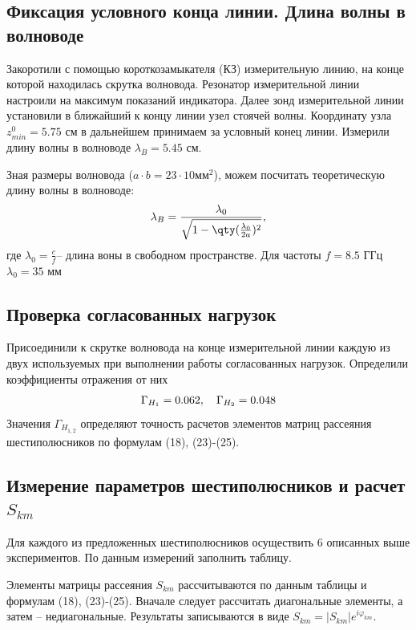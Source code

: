 \subsection{Фиксация условного конца линии. Длина волны в волноводе}

Закоротили с помощью короткозамыкателя (КЗ) измерительную линию, на конце которой  находилась скрутка волновода. Резонатор измерительной линии настроили на максимум показаний индикатора. Далее зонд измерительной линии установили в ближайший к концу линии узел стоячей волны. Координату узла $z^0_{min}=5.75$ см в дальнейшем принимаем за условный конец линии. Измерили длину волны в волноводе $\lambda_B=5.45 $ см.

Зная размеры волновода ($a\cdot b= 23\cdot 10 \text{мм}^2$), можем посчитать теоретическую длину волны в волноводе:
\begin{equation}
	\lambda_{B}=\frac{\lambda_0}{\sqrt{1-\qty(\frac{\lambda_0}{2a})^2}},
\end{equation}
где $\lambda_0=\frac{c}{f}$-- длина воны в свободном пространстве. Для частоты $f=8.5$ ГГц
$\lambda_0=35$ мм
\subsection{Проверка согласованных нагрузок}

Присоединили к скрутке волновода на конце измерительной линии каждую из двух используемых при выполнении работы согласованных нагрузок. Определили коэффициенты отражения от них
\begin{equation}
	\centering
 	\Gamma_{H_1}=0.062, ~~~ \Gamma_{H_2}=0.048 
\end{equation}
Значения  $\Gamma_{H_{1,2}}$ определяют точность расчетов элементов матриц рассеяния шестиполюсников по формулам (18), (23)-(25).

\subsection{Измерение параметров шестиполюсников и расчет $S_{km}$}

Для каждого из предложенных шестиполюсников осуществить 6 описанных выше экспериментов. По данным измерений заполнить таблицу.

Элементы матрицы рассеяния $S_{km}$ рассчитываются по данным таблицы и формулам (18), (23)-(25). Вначале следует рассчитать диагональные элементы, а затем -- недиагональные. Результаты записываются в виде $S _ { k m } = \left| S _ { k m } \right| e ^ { i \varphi _ { k m } }$.

